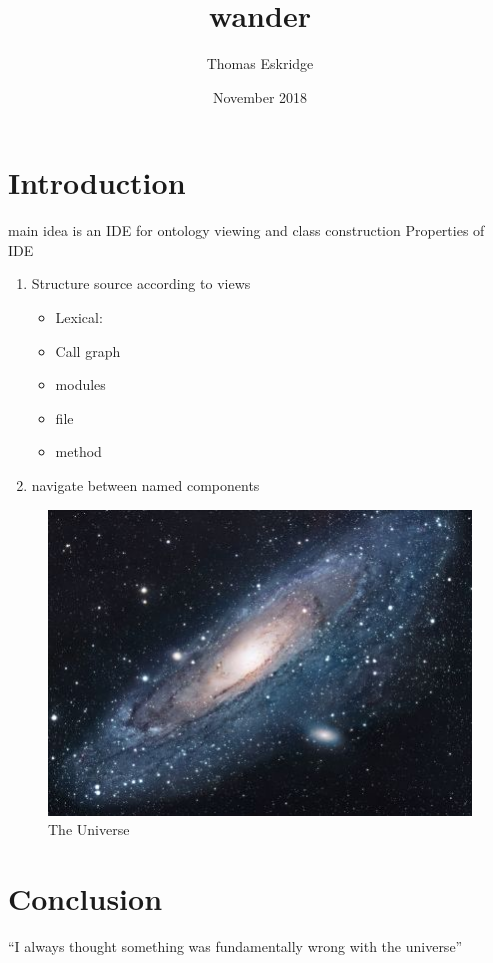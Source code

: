 \documentclass{article}
\title{wander}
\author{Thomas Eskridge}
\date{November 2018}
\begin{document}
\maketitle

\section{Introduction}

main idea is an IDE for ontology viewing and class construction
Properties of IDE
\begin{enumerate}
    \item Structure source according to views
    \begin{itemize}
        \item Lexical: 
        \item Call graph
        \item modules
        \item file
        \item method
    \end{itemize}
    \item navigate between named components
\end{enumerate}

\begin{figure}[h!]
\centering
\includegraphics[scale=1.7]{universe}
\caption{The Universe}
\label{fig:universe}
\end{figure}

\section{Conclusion}
``I always thought something was fundamentally wrong with the universe'' \citep{adams1995hitchhiker}



\end{document}
